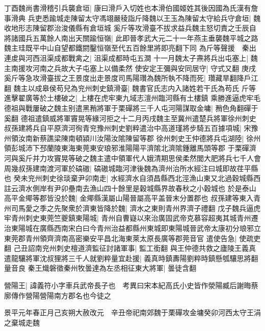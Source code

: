 丁酉魏尚書滑稽引兵襲倉垣|{
	康曰滑戶入切姓也本滑伯國姬姓其後因國為氏漢有詹事滑典}
兵吏悉踰城走陳留太守馮翊嚴稜詣斤降魏以王玉為陳留太守給兵守倉垣|{
	魏收地形志陳留郡治浚儀縣有倉垣城}
奚斤等攻滑臺不拔求益兵魏主怒切責之壬辰自將諸國兵五萬餘人南出天關踰恒嶺|{
	此即晉孝武大元二十一年燕主垂襲魏平城之路魏主珪既平中山自望都鐵閼鑿恒嶺至代五百餘里將即亮翻下同}
為斤等聲援　秦出連䖍與河西沮渠成都戰禽之|{
	沮渠成都時屯五澗}
十一月魏太子燾將兵出屯塞上|{
	魏主南援攻河南之兵故大子屯塞上以備柔然}
使安定王彌與安同居守|{
	守式又翻}
庚戌奚斤等急攻滑臺拔之王景度出走景度司馬陽瓚為魏所執不降而死|{
	瓚藏旱翻降戶江翻}
魏主以成皋侯苟兒為兖州刺史鎮滑臺|{
	魏書官氏志内入諸姓若干氏為苟氏}
斤等進擊翟廣等於土樓破之|{
	上樓在虎牢東九域志澶州臨河縣有土樓鎮}
乘勝進逼虎牢毛德祖與戰屢破之魏主别遣黑矟將軍于栗磾將三千人屯河陽謀取金墉|{
	矟色角翻磾于奚翻}
德祖遣鎮威將軍竇晃等緣河拒之十二月丙戌魏主至冀州遣楚兵將軍徐州刺史叔孫建將兵自平原濟河徇青兖豫州刺史劉粹遣治中高道瑾將步騎五百據項城|{
	宋豫州領汝南新蔡譙梁陳南頓潁川汝陽汝隂陳留等郡}
徐州刺史王仲德將兵屯湖陸|{
	徐州領彭城沛下邳蘭陵東海東莞東安琅邪淮陽陽平濟隂北濟隂鍾離馬頭等郡}
于栗磾濟河與奚斤并力攻竇晃等破之魏主遣中領軍代人娥清期思侯柔然閭大肥將兵七千人會周幾叔孫建南渡河軍於碻磝|{
	碻磝城臨河津後魏為濟州治所水經注曰城即故荏平縣也}
癸未兖州刺史徐琰棄尹卯南走|{
	水經濟水自須昌縣西北涇漁山東又北過穀城縣西註云濟水側岸有尹卯壘南去漁山四十餘里是穀城縣界故春秋之小穀城也}
於是泰山高平金鄊等郡皆没於魏|{
	金鄊縣漢屬山陽晉屬高平盖晉末分置郡也}
叔孫建等東入青州司馬愛之季之先聚衆於濟東皆降於魏|{
	濟水之東則青州界濟子禮翻}
戊子魏兵逼虎牢青州刺史東莞竺夔鎮東陽城|{
	青州自曹嶷以來治廣固武帝克慕容超夷其城青州遷治東陽城在廣縣西南宋白曰今青州治益都縣州東城即東陽城晉武帝太康初分琅邪立東莞郡青州領齊濟南高密樂安平昌北海東萊太原長廣等郡莞音官}
遣使告急|{
	使疏吏翻}
己丑詔南兖州刺史檀道濟監征討諸軍事|{
	監工銜翻}
與王仲德共救之廬陵王義真遣龍驤將軍沈叔狸將三千人就劉粹量宜赴援|{
	義真時鎮夀陽劉粹時鎮懸瓠驤思將翻量音良}
秦王熾磐徵秦州牧曇達為左丞相征東大將軍|{
	曇徒含翻}


營陽王|{
	諱義符小字車兵武帝長子也　考異曰宋本紀高氏小史皆作滎陽臧后謝晦蔡廓傳作營陽營陽南方郡名也今徒之}


景平元年春正月己亥朔大赦改元　辛丑帝祀南郊魏于栗磾攻金墉癸卯河西太守王涓之棄城走魏

